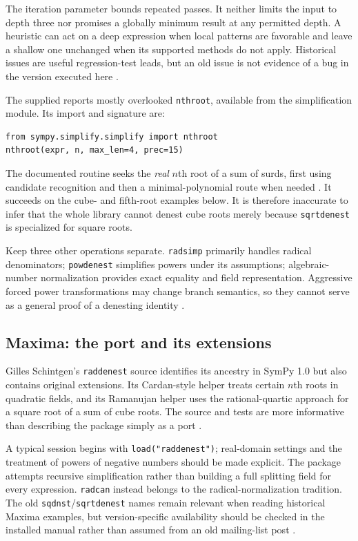 \documentclass[11pt,a4paper]{article}
\numberwithin{equation}{section}
\theoremstyle{definition}\newtheorem{definition}[theorem]{Definition}
\theoremstyle{remark}\newtheorem{remark}[theorem]{Remark}
\begin{document}
The iteration parameter bounds repeated passes. It neither limits the input to depth three nor promises a globally minimum result at any permitted depth. A heuristic can act on a deep expression when local patterns are favorable and leave a shallow one unchanged when its supported methods do not apply. Historical issues are useful regression-test leads, but an old issue is not evidence of a bug in the version executed here \cite{sympyissue}.

The supplied reports mostly overlooked \texttt{nthroot}, available from the simplification module. Its import and signature are:
\begin{lstlisting}
from sympy.simplify.simplify import nthroot
nthroot(expr, n, max_len=4, prec=15)
\end{lstlisting}
 The documented routine seeks the \emph{real} $n$th root of a sum of surds, first using candidate recognition and then a minimal-polynomial route when needed \cite{sympydocs}. It succeeds on the cube- and fifth-root examples below. It is therefore inaccurate to infer that the whole library cannot denest cube roots merely because \texttt{sqrtdenest} is specialized for square roots.

Keep three other operations separate. \texttt{radsimp} primarily handles radical denominators; \texttt{powdenest} simplifies powers under its assumptions; algebraic-number normalization provides exact equality and field representation. Aggressive forced power transformations may change branch semantics, so they cannot serve as a general proof of a denesting identity \cite{sympydocs}.

\subsection{Maxima: the port and its extensions}
Gilles Schintgen's \texttt{raddenest} source identifies its ancestry in SymPy 1.0 but also contains original extensions. Its Cardan-style helper treats certain $n$th roots in quadratic fields, and its Ramanujan helper uses the rational-quartic approach for a square root of a sum of cube roots. The source and tests are more informative than describing the package simply as a port \cite{raddenestsrc}.

A typical session begins with \texttt{load("raddenest")}; real-domain settings and the treatment of powers of negative numbers should be made explicit. The package attempts recursive simplification rather than building a full splitting field for every expression. \texttt{radcan} instead belongs to the radical-normalization tradition. The old \texttt{sqdnst}/\texttt{sqrtdenest} names remain relevant when reading historical Maxima examples, but version-specific availability should be checked in the installed manual rather than assumed from an old mailing-list post \cite{maximamanual,maximathread}.
\end{document}
